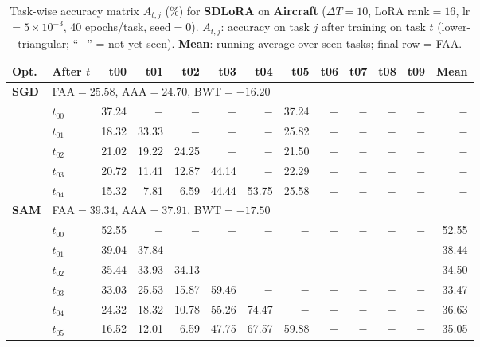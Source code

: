 \begin{table}[ht]
\centering
\caption{%
  Task-wise accuracy matrix $A_{t,j}$ (\%) for \textbf{SDLoRA} on \textbf{Aircraft} ($\Delta T=10$, LoRA rank$=16$, lr$=5\times10^{-3}$, 40 epochs/task, seed$=0$).
  $A_{t,j}$: accuracy on task $j$ after training on task $t$  (lower-triangular; ``$-$'' = not yet seen).
  \textbf{Mean}: running average over seen tasks; final row = FAA.
}
\label{tab:raw_sdlora_aircraft}
\setlength{\tabcolsep}{2.8pt}
\renewcommand{\arraystretch}{0.88}
\scriptsize
\begin{tabular}{@{}l l r r r r r r r r r r r@{}}
\toprule
\textbf{Opt.} & \textbf{After $t$} & \textbf{t00} & \textbf{t01} & \textbf{t02} & \textbf{t03} & \textbf{t04} & \textbf{t05} & \textbf{t06} & \textbf{t07} & \textbf{t08} & \textbf{t09} & \textbf{Mean} \\
\midrule
\multirow{6}{*}{\textbf{SGD}} & \multicolumn{12}{l}{\quad\small FAA$=25.58$,\; AAA$=24.70$,\; BWT$=-16.20$} \\
 & $t_{00}$ & 37.24 & $-$ & $-$ & $-$ & $-$ & 37.24 & $-$ & $-$ & $-$ & $-$ & $-$ \\
 & $t_{01}$ & 18.32 & 33.33 & $-$ & $-$ & $-$ & 25.82 & $-$ & $-$ & $-$ & $-$ & $-$ \\
 & $t_{02}$ & 21.02 & 19.22 & 24.25 & $-$ & $-$ & 21.50 & $-$ & $-$ & $-$ & $-$ & $-$ \\
 & $t_{03}$ & 20.72 & 11.41 & 12.87 & 44.14 & $-$ & 22.29 & $-$ & $-$ & $-$ & $-$ & $-$ \\
 & $t_{04}$ & 15.32 & 7.81 & 6.59 & 44.44 & 53.75 & 25.58 & $-$ & $-$ & $-$ & $-$ & $-$ \\
\midrule
\multirow{11}{*}{\textbf{SAM}} & \multicolumn{12}{l}{\quad\small FAA$=39.34$,\; AAA$=37.91$,\; BWT$=-17.50$} \\
 & $t_{00}$ & 52.55 & $-$ & $-$ & $-$ & $-$ & $-$ & $-$ & $-$ & $-$ & $-$ & 52.55 \\
 & $t_{01}$ & 39.04 & 37.84 & $-$ & $-$ & $-$ & $-$ & $-$ & $-$ & $-$ & $-$ & 38.44 \\
 & $t_{02}$ & 35.44 & 33.93 & 34.13 & $-$ & $-$ & $-$ & $-$ & $-$ & $-$ & $-$ & 34.50 \\
 & $t_{03}$ & 33.03 & 25.53 & 15.87 & 59.46 & $-$ & $-$ & $-$ & $-$ & $-$ & $-$ & 33.47 \\
 & $t_{04}$ & 24.32 & 18.32 & 10.78 & 55.26 & 74.47 & $-$ & $-$ & $-$ & $-$ & $-$ & 36.63 \\
 & $t_{05}$ & 16.52 & 12.01 & 6.59 & 47.75 & 67.57 & 59.88 & $-$ & $-$ & $-$ & $-$ & 35.05 \\

\end{tabular}
\end{table}
